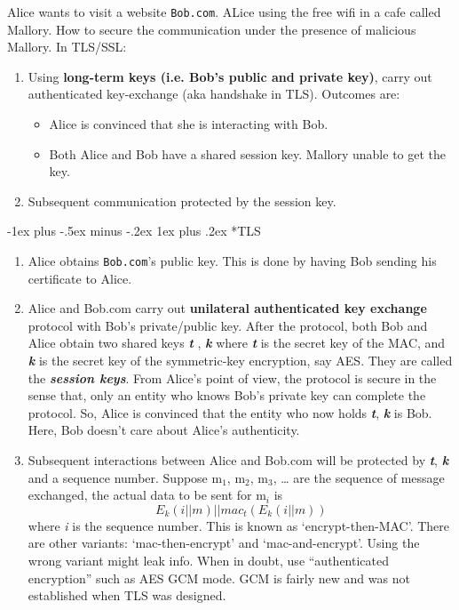 \documentclass[10pt,landscape]{article}
\makeatletter
\renewcommand{\subsubsection}{\@startsection{subsubsection}{3}{0mm}%
                                {-1ex plus -.5ex minus -.2ex}%
                                {1ex plus .2ex}%
                                {\normalfont\small\bfseries}}
\makeatother
\begin{document}
\begin{multicols*}{3}
Alice wants to visit a website \verb|Bob.com|. ALice using the free wifi in a cafe called Mallory.
How to secure the communication under the presence of malicious Mallory. In TLS/SSL:
\begin{enumerate}[noitemsep,wide=0pt, leftmargin=\dimexpr\labelwidth + 2\labelsep\relax]
    \item Using \textbf{long-term keys (i.e. Bob’s public and private key)}, carry out
    authenticated key-exchange (aka handshake in TLS). Outcomes are:
    \begin{itemize}[noitemsep,wide=0pt, leftmargin=\dimexpr{} + 2\relax]
        \item Alice is convinced that she is interacting with Bob.
        \item Both Alice and Bob have a shared session key. Mallory unable to get the key.
    \end{itemize}
    \item Subsequent communication protected by the session key.
\end{enumerate}

\subsubsection*{TLS}
\begin{enumerate}[noitemsep,wide=0pt, leftmargin=\dimexpr\labelwidth + 2\labelsep\relax]
    \item Alice obtains \verb|Bob.com|’s public key. This is done by having Bob sending his certificate to Alice.
    \item Alice and Bob.com carry out \textbf{unilateral authenticated key exchange}
    protocol with Bob’s private/public key. After the protocol, both Bob and Alice obtain
    two shared keys \textbf{\textit{t}} , \textbf{\textit{k}} where \textbf{\textit{t}} is the secret key of the MAC, and \textbf{\textit{k}} is the secret key of
    the symmetric-key encryption, say AES. They are called the \textbf{\textit{session keys}}. From
    Alice’s point of view, the protocol is secure in the sense that, only an entity who
    knows Bob’s private key can complete the protocol. So, Alice is convinced that the
    entity who now holds \textbf{\textit{t}}, \textbf{\textit{k}} is Bob. Here, Bob doesn’t care about Alice’s authenticity.
    \item Subsequent interactions between Alice and Bob.com will be protected by
    \textbf{\textit{t}}, \textbf{\textit{k}} and a sequence number. Suppose m$_1$, m$_2$, m$_3$, … are the sequence of message
    exchanged, the actual data to be sent for m$_i$ is
    \begin{equation*}
        E_k ( i || m ) || mac_t ( E_k ( i || m) )
    \end{equation*} where \textit{i} is the sequence number. This is known as `encrypt-then-MAC'. There are other variants: `mac-then-encrypt' and `mac-and-encrypt'. Using
    the wrong variant might leak info. When in doubt, use “authenticated encryption” such as AES GCM mode. GCM is fairly
    new and was not established when TLS was designed.
\end{enumerate}


\end{multicols*}
\end{document}
